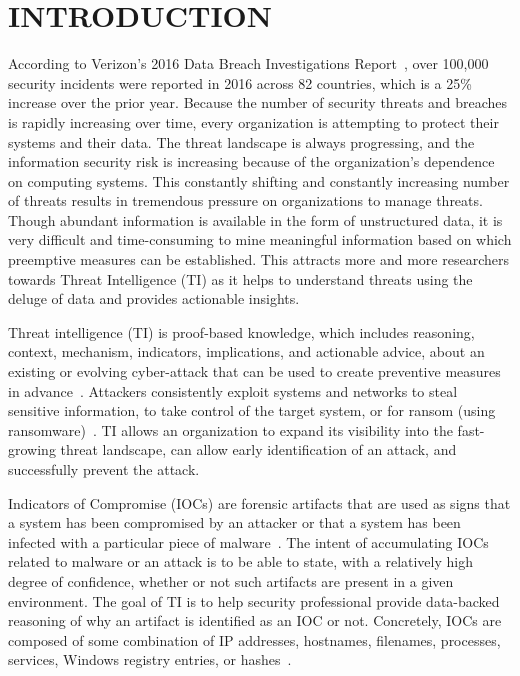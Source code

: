 \chapter{INTRODUCTION}
\label{chap:introduction}
According to Verizon's 2016 Data Breach Investigations Report~\cite{verizon}, over 100,000 security incidents were reported in 2016 across 82 countries, which is a 25\% increase over the prior year. Because the number of security threats and breaches is rapidly increasing over time, every organization is attempting to protect their systems and their data. The threat landscape is always progressing, and the information security risk is increasing because of the organization's dependence on computing systems. This constantly shifting and constantly increasing number of threats results in tremendous pressure on organizations to manage threats.
Though abundant information is available in the form of unstructured data, it is very difficult and time-consuming to mine meaningful information based on which preemptive measures can be established. This attracts more and more researchers towards Threat Intelligence (TI) as it helps to understand threats using the deluge of data and provides actionable insights.

Threat intelligence (TI) is proof-based knowledge, which includes reasoning, context, mechanism, indicators, implications, and actionable advice, about an existing or evolving cyber-attack that can be used to create preventive measures in advance~\cite{rob}.  Attackers consistently exploit systems and networks to steal sensitive information, to take control of the target system, or for ransom (using ransomware)~\cite{gorman}. TI allows an organization to expand its visibility into the fast-growing threat landscape, can allow early identification of an attack, and successfully prevent the attack. 

Indicators of Compromise (IOCs) are forensic artifacts that are used as signs that a system has been compromised by an attacker or that a system has been infected with a particular piece of malware~\cite{catakoglu}. The intent of accumulating IOCs related to malware or an attack is to be able to state, with a relatively high degree of confidence, whether or not such artifacts are present in a given environment. The goal of TI is to help security professional provide data-backed reasoning of why an artifact is identified as an IOC or not. Concretely, IOCs are composed of some combination of IP addresses, hostnames, filenames, processes, services, Windows registry entries, or hashes~\cite{andress}.


